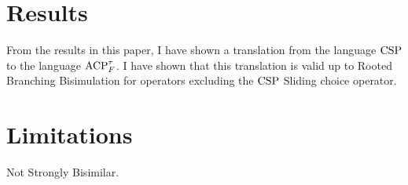 \documentclass[../hons_project.tex]{subfiles}
\begin{document}
\section{Results}
From the results in this paper, I have shown a translation from the language $\mathrm{CSP}$ to the language $\mathrm{ACP}_{F}^{\tau}$. I have shown that this translation is valid up to Rooted Branching Bisimulation for operators excluding the $\mathrm{CSP}$ Sliding choice operator.
\section{Limitations}
Not Strongly Bisimilar.
    
\end{document}
